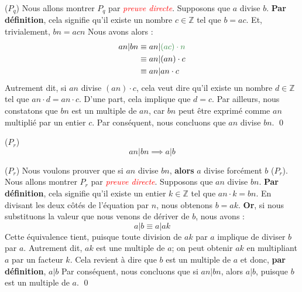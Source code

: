 \documentclass[16pt]{report}
\begin{document}
\begin{multicols*}{2}
    \begin{Preuve*}{($P_q$)}{}
        Nous allons montrer $P_q$ par \textcolor{red}{\textit{preuve directe}}.    
        Supposons que $a$ divise $b$. \textbf{Par définition}, cela signifie qu'il existe un nombre 
        $c \in \mathbb{Z}$ tel que 
        \textcolor{myb}{$b = ac$}. Et, trivialement, $bn = acn$ Nous avons alors : 
        \begin{align*}
            an|bn &\equiv an|\textcolor{myg}{(ac) \cdot n} \\
                        &\equiv an|(an) \cdot c \\
                        &\equiv an|an \cdot c
        \end{align*}
        Autrement dit, si $an$ divise \textcolor{myg}{$(an)\cdot  c$}, 
        cela veut dire qu'il existe un nombre $d \in \mathbb{Z}$ tel que 
        $an \cdot d = an \cdot c$. D'une part, cela implique  que $d = c$. 
        Par ailleurs, nous constatons que $bn$ est un multiple de $an$, car $bn$ peut être exprimé comme 
        $an$ multiplié par un entier $c$. Par conséquent, nous concluons 
        que $an$ divise $bn$.
        \qed 
    \end{Preuve*}    

    \begin{prop}{($P_r$)}{}
        \[ an|bn \implies  a|b \]
    \end{prop}

    \begin{Preuve*}{($P_r$)}{}
        Nous voulons prouver que si $an$ divise $bn$, \textbf{alors} $a$ divise forcément $b$ ($P_r$). 
        Nous allons montrer $P_r$ par \textcolor{red}{\textit{preuve directe}}. Supposons que $an$ divise $bn$. 
        \textbf{Par définition}, cela signifie qu'il existe un entier $k \in \mathbb{Z}$ tel que 
        \textcolor{myb}{$an \cdot k = bn$}.  En divisant les deux côtés de l'équation par $n$, 
        nous obtenons $b = ak$. \textbf{Or}, si nous substituons la valeur que 
        nous venons de dériver de $b$, nous avons : 
                            \[ a|b \equiv a|ak \]
        Cette équivalence tient, puisque toute division de $ak$ par $a$ implique de diviser $b$ par $a$.  
        Autrement dit, $ak$ est une multiple de 
        $a$; on peut obtenir $ak$ en multipliant $a$ par un facteur $k$. Cela revient à dire 
        que $b$ est un multiple de $a$ et donc, \textbf{par définition}, $a|b$ Par conséquent, nous 
        concluons que si $an|bn$, alors $a|b$, puisque $b$ est un multiple de $a$. \qed
    \end{Preuve*}
    


\end{multicols*}
\end{document}
